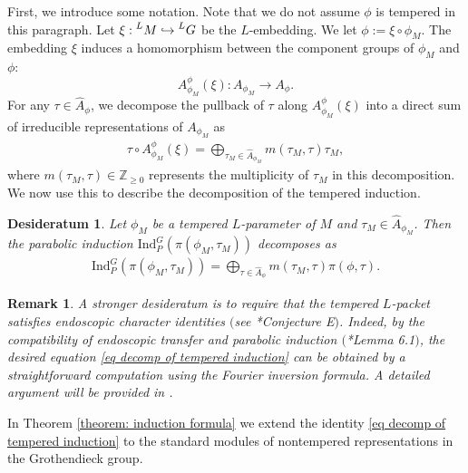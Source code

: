 \documentclass[11pt,letterpaper]{amsart}
\newcommand{\Z}{\mathbb{Z}}
\newcommand{\irrepdual}[1]{\widehat{#1}}
\newcommand{\Ind}{\mathrm{Ind}}
\newtheorem{remark}[thm]{Remark}
\newtheorem{desideratum}[thm]{Desideratum}
\renewcommand{\1}{\mathbbm{1}}
\numberwithin{equation}{section}
\begin{document}
{First, we introduce some notation. Note that we do not assume $\phi$ is tempered in this paragraph.
Let $\xi: \prescript{L}{}{M} \hookrightarrow \prescript{L}{}{G}$ be the $L$-embedding. We let $\phi := \xi \circ \phi_M$. The embedding $\xi$ induces a homomorphism between the component groups of $\phi_M$ and $\phi$:
\[ A_{\phi_M}^{\phi}(\xi): A_{\phi_M} \to A_{\phi}.\]
For any $\tau \in \irrepdual{A}_{\phi}$, we decompose the pullback of $\tau$ along $A_{\phi_M}^{\phi}(\xi)$ into a direct sum of irreducible representations of $A_{\phi_M}$ as
\begin{align}\label{equation: pullback of tau}
\tau \circ A_{\phi_M}^{\phi}(\xi) = \bigoplus_{\tau_M \in \irrepdual{A}_{\phi_M}} m(\tau_M, \tau)\tau_M, 
\end{align}
where $m(\tau_M, \tau) \in \Z_{\geq 0}$ represents the multiplicity of $\tau_M$ in this decomposition. We now use this to describe the decomposition of the tempered induction. 

\begin{desideratum}\label{desideratum: induction of tempered representations}
    Let $\phi_M$ be a tempered $L$-parameter of $M$ and $\tau_M \in \irrepdual{A}_{\phi_M}$. Then the parabolic induction $\Ind_P^G (\pi(\phi_M,\tau_M))$ decomposes as
    \begin{align}\label{eq decomp of tempered induction}
        \Ind_{P}^{G} (\pi(\phi_M,\tau_M))=\bigoplus_{\tau \in \irrepdual{A}_{\phi}} m(\tau_M, \tau) \pi(\phi, \tau).
    \end{align}
\end{desideratum}

\begin{remark} {\label{remark: tempered induction from ECI}}
    A stronger desideratum is to require that the tempered $L$-packet satisfies endoscopic character identities $($see \cite{Kal16}*{Conjecture E}$)$. Indeed, by the compatibility of endoscopic transfer and parabolic induction $($\cite{Hir04}*{Lemma 6.1}$)$, the desired equation \eqref{eq decomp of tempered induction} can be obtained by a straightforward computation using the Fourier inversion formula. A detailed argument will be provided in \cite{KLT}.
\end{remark}

In Theorem \ref{theorem: induction formula} we extend the identity \eqref{eq decomp of tempered induction} to the standard modules of nontempered representations in the Grothendieck group.

}
\end{document}
